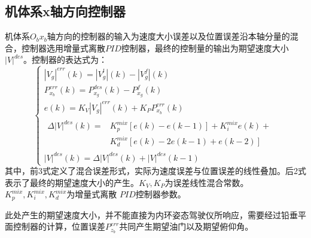 \subsection{机体系x轴方向控制器}
机体系$O_bx_b$轴方向的控制器的输入为速度大小误差以及位置误差沿本轴分量的混合，控制器选用增量式离散$PID$控制器，最终的控制量的输出为期望速度大小${|V|}^{des}$。控制器的表达式为：
\begin{equation}
    \left\{
    \begin{array}{l}
        |V_g|^{err}(k)=|V_g^{l}|(k)-|V_g^{f}|(k)\\
        P_{x_b}^{err}(k)=P_{x_g}^{des}(k)-P_{x_g}^{f}(k)\\
        e(k)=K_V|V_g|^{err}(k)+K_PP_{x_b}^{err}(k)\\
        \begin{aligned}
        \Delta{|V|}^{des}(k)=&K_{p}^{mix}[e(k)-e(k-1)]+K_{i}^{mix}e(k)+\\
        &K_{d}^{mix}[e(k)-2e(k-1)+e(k-2)]
        \end{aligned}
        \\
        {|V|}^{des}(k)=\Delta{|V|}^{des}(k)+{|V|}^{des}(k-1)
    \end{array}
    \right .
    \label{xb_vel_gen_equ}
\end{equation}
其中，前3式定义了混合误差形式，实际为速度误差与位置误差的线性叠加。后2式表示了最终的期望速度大小的产生。$K_V,K_P$为误差线性混合常数。$K_{p}^{mix},K_{i}^{mix},K_{d}^{mix}$为增量式离散
$PID$控制器参数。

此处产生的期望速度大小，并不能直接为内环姿态驾驶仪所响应，需要经过铅垂平面控制器的计算，位置误差$P_{z_b}^{err}$共同产生期望油门以及期望俯仰角。
